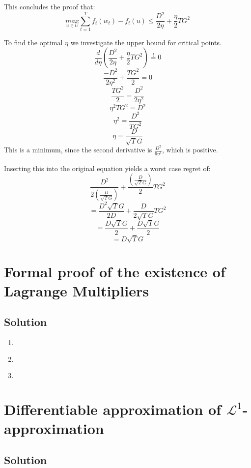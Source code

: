 \documentclass[10pt]{article}
\numberwithin{equation}{section}
\begin{document}
\begin{enumerate}
{This concludes the proof that:
$$\underset{u \in U}{max} \sum_{t=1}^T f_t(w_t) - f_t(u) \leq  \frac{D^2}{2\eta} + \frac{\eta}{2} T G^2$$

\item[d)]{
    To find the optimal $\eta$ we investigate the upper bound for critical points.
    $$ \frac{d}{d \eta} \left( \frac{D^2}{2\eta} + \frac{\eta}{2} T G^2\right)  \overset{!}{=} 0$$
    $$\frac{-D^2}{2\eta^2} + \frac{TG^2}{2} = 0 $$
    $$\frac{TG^2}{2} = \frac{D^2}{2\eta^2}  $$
    $$\eta^2TG^2 = D^2$$
    $$\eta^2 = \frac{D^2}{TG^2}$$
    $$\eta = \frac{D}{\sqrt{T}G}$$
    This is a minimum, since the second derivative is $\frac{D^2}{6\eta^3}$, which is positive.

    Inserting this into the original equation yields a worst case regret of:
    $$\frac{D^2}{2\left(\frac{D}{\sqrt{T}{G}}\right)} + \frac{\left(\frac{D}{\sqrt{T}G}\right)}{2} T G^2$$
    $$=\frac{D^2\sqrt{T}G}{2D} + \frac{D}{2\sqrt{T}G} T G^2$$
    $$=\frac{D\sqrt{T}G}{2} + \frac{D\sqrt{T}G}{2}$$
    $$=D\sqrt{T}G$$
  }
    


}
\end{enumerate}
\section*{Formal proof of the existence of Lagrange Multipliers}

\subsection*{Solution}
\begin{enumerate}
\item[a)]{

}
\item[b)]{
}
\item[c)]{

  }

\end{enumerate}

\section*{Differentiable approximation of $\mathcal{L}^1$-approximation}
\subsection*{Solution}
\end{document}
